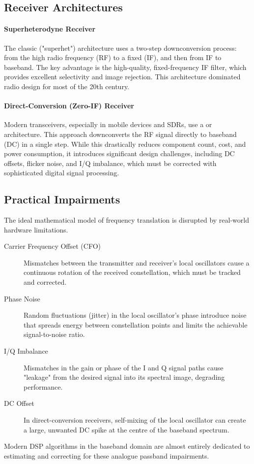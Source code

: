 \subsection{Receiver Architectures}

\paragraph{Superheterodyne Receiver}
The classic  ("superhet") architecture uses a two-step downconversion process: from the high radio frequency (RF) to a fixed  (IF), and then from IF to baseband. The key advantage is the high-quality, fixed-frequency IF filter, which provides excellent selectivity and image rejection. This architecture dominated radio design for most of the 20th century.

\paragraph{Direct-Conversion (Zero-IF) Receiver}
Modern transceivers, especially in mobile devices and SDRs, use a  or  architecture. This approach downconverts the RF signal directly to baseband (DC) in a single step. While this drastically reduces component count, cost, and power consumption, it introduces significant design challenges, including DC offsets, flicker noise, and I/Q imbalance, which must be corrected with sophisticated digital signal processing.

\subsection{Practical Impairments}

The ideal mathematical model of frequency translation is disrupted by real-world hardware limitations.
\begin{description}
    \item[Carrier Frequency Offset (CFO)] Mismatches between the transmitter and receiver's local oscillators cause a continuous rotation of the received constellation, which must be tracked and corrected.
    \item[Phase Noise] Random fluctuations (jitter) in the local oscillator's phase introduce noise that spreads energy between constellation points and limits the achievable signal-to-noise ratio.
    \item[I/Q Imbalance] Mismatches in the gain or phase of the I and Q signal paths cause "leakage" from the desired signal into its spectral image, degrading performance.
    \item[DC Offset] In direct-conversion receivers, self-mixing of the local oscillator can create a large, unwanted DC spike at the centre of the baseband spectrum.
\end{description}
Modern DSP algorithms in the baseband domain are almost entirely dedicated to estimating and correcting for these analogue passband impairments.

